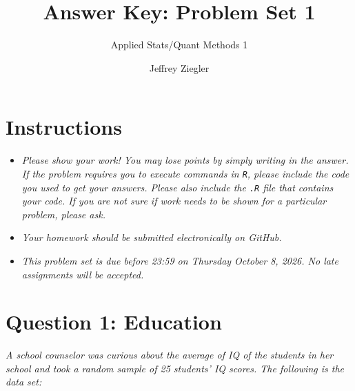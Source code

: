 \documentclass[12pt,letterpaper]{article}
\title{Answer Key: Problem Set 1}
\date{Jeffrey Ziegler}
\author{Applied Stats/Quant Methods 1}
\begin{document}
	\maketitle
	
	\section*{Instructions}
\begin{itemize}
	\item \textit{Please show your work! You may lose points by simply writing in the answer. If the problem requires you to execute commands in \texttt{R}, please include the code you used to get your answers. Please also include the \texttt{.R} file that contains your code. If you are not sure if work needs to be shown for a particular problem, please ask.}
	\item \textit{Your homework should be submitted electronically on GitHub.}
	\item \textit{This problem set is due before 23:59 on Thursday October 8, 2026. No late assignments will be accepted.}

\end{itemize}

\vspace{1cm}
\section*{Question 1: Education}

\textit{A school counselor was curious about the average of IQ of the students in her school and took a random sample of 25 students' IQ scores. The following is the data set:}\\
\vspace{.25cm}

  

\vspace{.5cm}
\end{document}
